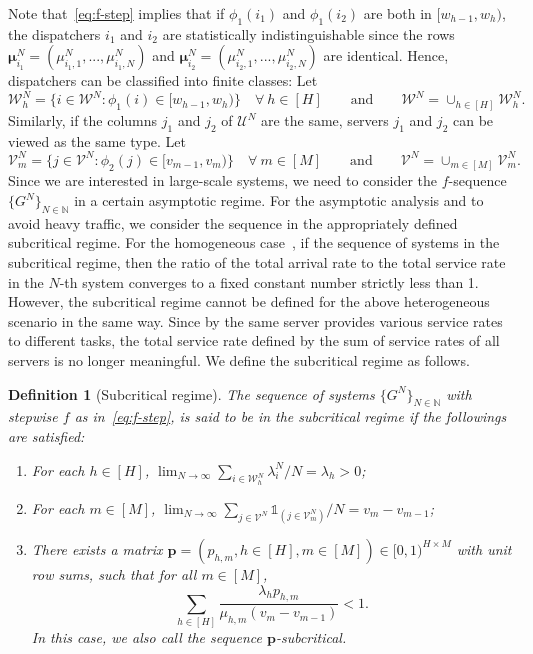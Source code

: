 \documentclass[11pt, reqno]{article}
\newtheorem{defn}[theorem]{Definition}
\numberwithin{equation}{section}
\numberwithin{theorem}{section}
\newcommand{\N}{\mathbb{N}}                 %
\begin{document}
Note that~\eqref{eq:f-step} implies that if $\phi_1(i_1)$ and $\phi_1(i_2)$ are both in $[w_{h-1},w_h)$, the dispatchers $i_1$ and $i_2$ are statistically indistinguishable since the rows $\boldsymbol\mu^N_{i_1}=(\mu^N_{i_1,1},...,\mu^N_{i_1,N})$ and $\boldsymbol\mu^N_{i_2}=(\mu^N_{i_2,1},...,\mu^N_{i_2,N})$ are identical. 
Hence, dispatchers can be classified into finite classes: Let 
$$\mathcal{W}^N_h=\Big\{i\in\mathcal{W}^N:\phi_1(i)\in[w_{h-1},w_h)\Big\}\quad\forall\ h\in[H]\qquad\text{and}\qquad \mathcal{W}^N=\cup_{h\in[H]}\mathcal{W}^N_h.$$  
Similarly, if the columns $j_1$ and $j_2$ of $\mathcal{U}^N$ are the same, servers $j_1$ and $j_2$ can be viewed as the same type. Let 
$$\mathcal{V}^N_m=\{j\in\mathcal{V}^N:\phi_2(j)\in[v_{m-1},v_m)\}\quad\forall\ m\in[M]\qquad\text{and}\qquad \mathcal{V}^N=\cup_{m\in[M]}\mathcal{V}^N_m.$$ 
Since we are interested in large-scale systems, we need to consider the $f$-sequence $\{G^N\}_{N\in\N}$ in a certain asymptotic regime. 
For the asymptotic analysis and to avoid heavy traffic, we consider the sequence in the appropriately defined subcritical regime. 
For the homogeneous case~\cite{MBLW16-3}, if the sequence of systems in the subcritical regime, then the ratio of the total arrival rate to the total service rate in the $N$-th system converges to a fixed constant number strictly less than 1. 
However, the subcritical regime cannot be defined for the above heterogeneous scenario in the same way. 
Since by the same server provides various service rates to different tasks, the total service rate defined by the sum of service rates of all servers is no longer meaningful. 
We define the subcritical regime as follows.
\begin{defn}[Subcritical regime]\label{def: subcritical-finite}The sequence of systems $\{G^N\}_{N\in\N}$  with stepwise $f$ as in~\eqref{eq:f-step}, is said to be in the \textit{subcritical regime} if the followings are satisfied:
\begin{enumerate}[\normalfont(i)]
    \item For each $h\in[H]$, $\lim_{N\rightarrow\infty}\sum_{i\in\mathcal{W}^N_h}\lambda^N_i/N=\lambda_h>0$;
    \item For each $m\in[M]$, $\lim_{N\rightarrow\infty}\sum_{j\in\mathcal{V}^N}\mathds{1}_{(j\in\mathcal{V}^N_m)}/N=v_m-v_{m-1}$;
    \item There exists a matrix  $\mathbf{p}=(p_{h,m},h\in[H],m\in[M])\in[0,1)^{H\times M}$ with unit row sums, such that for all $m\in[M]$,    \begin{equation}\label{eq:subcritical-finite}
       \sum_{h\in[H]} \frac{\lambda_h p_{h,m}}{\mu_{h,m}(v_m-v_{m-1})}<1.
    \end{equation}
    In this case, we also call the sequence $\mathbf{p}$-subcritical.
\end{enumerate}
\end{defn}
\end{document}
